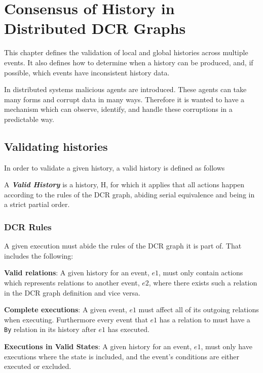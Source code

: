 \chapter{Consensus of History in Distributed DCR Graphs}
\label{chap:consensusindcr}
	This chapter defines the validation of local and global histories across multiple events. It also defines how to determine when a history can be produced, and, if possible, which events have inconsistent history data.
	
	In distributed systems malicious agents are introduced. These agents can take many forms and corrupt data in many ways. Therefore it is wanted to have a mechanism which can observe, identify, and handle these corruptions in a predictable way. 
	
	
	\section{Validating histories}
	In order to validate a given history, a valid history is defined as follows
	
		\begin{definition}
			A \textit{\textbf{Valid History}} is a history, H, for which it applies that all actions happen according to the rules of the DCR graph, abiding serial equivalence and being in a strict partial order. 
		\end{definition}
		
	\subsection{DCR Rules}
	A given execution must abide the rules of the DCR graph it is part of. That includes the following:
	
	\newpar \textbf{Valid relations}: A given history for an event, $e1$, must only contain actions which represents relations to another event, $e2$, where there exists such a relation in the DCR graph definition and vice versa. 
	
	\newpar \textbf{Complete executions}: A given event, $e1$ must affect all of its outgoing relations when executing. Furthermore every event that $e1$ has a relation to must have a \texttt{By} relation in its history after $e1$ has executed.
	
	\newpar \textbf{Executions in Valid States}: A given history for an event, $e1$, must only have executions where the state is included, and the event's conditions are either executed or excluded.
	
